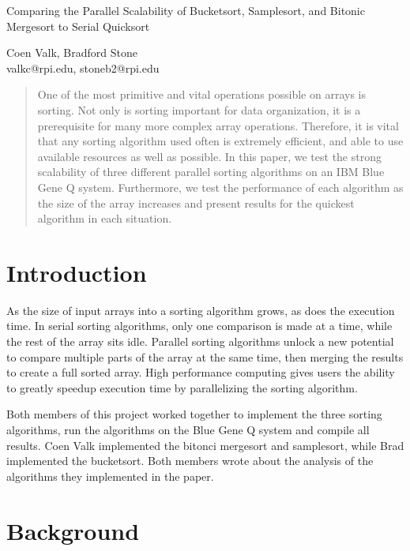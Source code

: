 \documentclass[10pt,letterpaper]{article}
\begin{document}
\begin{center}
\begin{huge}
Comparing the Parallel Scalability of Bucketsort, Samplesort, and Bitonic Mergesort to Serial Quicksort\\
\end{huge}
\vspace{0.25in}
\begin{large}
Coen Valk, Bradford Stone\\
valkc@rpi.edu, stoneb2@rpi.edu\\
\end{large}
\end{center}
\vspace{0.25in}
\begin{multicols}{2}
\begin{abstract}
One of the most primitive and vital operations possible on arrays is sorting. Not only is sorting important for data organization, it is a prerequisite for many more complex array operations. Therefore, it is vital that any sorting algorithm used often is extremely efficient, and able to use available resources as well as possible. In this paper, we test the strong scalability of three different parallel sorting algorithms on an IBM Blue Gene Q system. Furthermore, we test the performance of each algorithm as the size of the array increases and present results for the quickest algorithm in each situation.
\end{abstract}
\section{Introduction}
As the size of input arrays into a sorting algorithm grows, as does the execution time. In serial sorting algorithms, only one comparison is made at a time, while the rest of the array sits idle. Parallel sorting algorithms unlock a new potential to compare multiple parts of the array at the same time, then merging the results to create a full sorted array. High performance computing gives users the ability to greatly speedup execution time by parallelizing the sorting algorithm.

Both members of this project worked together to implement the three sorting algorithms, run the algorithms on the Blue Gene Q system and compile all results. Coen Valk implemented the bitonci mergesort and samplesort, while Brad implemented the bucketsort. Both members wrote about the analysis of the algorithms they implemented in the paper.

\section{Background}


\end{multicols}
\end{document}
